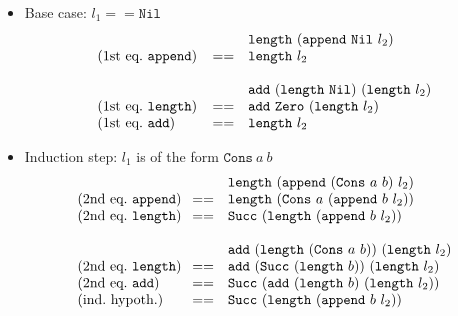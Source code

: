 \documentclass{article}
\begin{document}
\noindent
\begin{itemize}
%
\item Base case: $l_1 == \texttt{Nil}$ 
\[\begin{array}{p{1in}ll}
& & \texttt{length}\ (\texttt{append}\ \texttt{Nil}\ l_2)\\
\mbox{(1st eq.\ \texttt{append})}
& ==
& \texttt{length}\ l_2
\\
\mbox{}\\
& & \texttt{add}\ (\texttt{length}\ \texttt{Nil})\ (\texttt{length}\ l_2)\\
\mbox{(1st eq.\ \texttt{length})}
& ==
& \texttt{add}\ \texttt{Zero}\ (\texttt{length}\ l_2)
\\
\mbox{(1st eq.\ \texttt{add})}
& ==
& \texttt{length}\ l_2
\end{array}\]
%
%
%
\item Induction step: $l_1$ is of the form $\texttt{Cons}\ a\ b$
\[\begin{array}{p{1in}ll}
& & \texttt{length}\ (\texttt{append}\ (\texttt{Cons}\ a\ b)\ l_2)\\
\mbox{(2nd eq.\ \texttt{append})}
& ==
& \texttt{length}\ (\texttt{Cons}\ a\ (\texttt{append}\ b\ l_2))
\\
\mbox{(2nd eq.\ \texttt{length})}
& ==
& \texttt{Succ}\ (\texttt{length}\ (\texttt{append}\ b\ l_2))
\\
\mbox{}\\
& & \texttt{add}\ (\texttt{length}\ (\texttt{Cons}\ a\ b))\ (\texttt{length}\ l_2)\\
\mbox{(2nd eq.\ \texttt{length})}
& ==
& \texttt{add}\ (\texttt{Succ}\ (\texttt{length}\ b))\ (\texttt{length}\ l_2)
\\
\mbox{(2nd eq.\ \texttt{add})}
& ==
& \texttt{Succ}\ (\texttt{add}\ (\texttt{length}\ b)\ (\texttt{length}\ l_2))
\\
\mbox{(ind.\ hypoth.)}
& ==
& \texttt{Succ}\ (\texttt{length}\ (\texttt{append}\ b\ l_2))
\end{array}\]
%
\end{itemize}






\begin{comment}
\begin{code}
 data List (n::Nat) a = Nil where n=0
                      | Cons a (List m a) where n=m+1
\end{code}

\begin{code}
 append ::  List a l -> List a m -> List a (l+m)
 append (Cons x xs) ys = Cons x (append xs ys)
 append Nil ys = Nil 
\end{code}
\end{comment}
\end{document}
